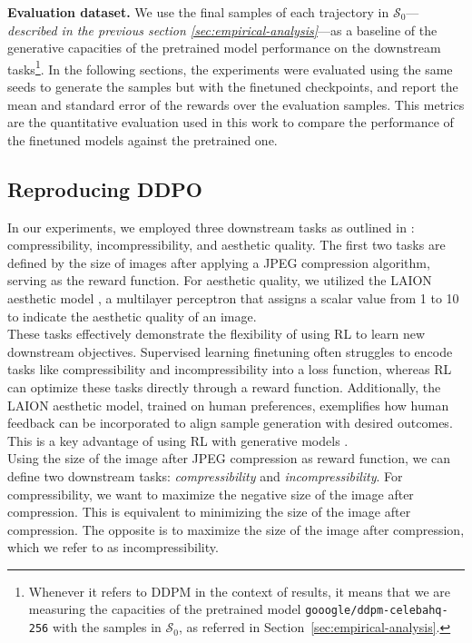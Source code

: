 \noindent \textbf{Evaluation dataset.} We use the final samples of each trajectory in $\mathcal{S}_{0}$---\textit{described in the previous section \ref{sec:empirical-analysis}}---as a baseline of the generative capacities of the pretrained model performance on the downstream tasks\footnote{Whenever it refers to DDPM in the context of results, it means that we are measuring the capacities of the pretrained model \texttt{gooogle/ddpm-celebahq-256} with the samples in $\mathcal{S}_{0}$, as referred in Section~\ref{sec:empirical-analysis}.}. In the following sections, the experiments were evaluated using the same seeds to generate the samples but with the finetuned checkpoints, and report the mean and standard error of the rewards over the evaluation samples. This metrics are the quantitative evaluation used in this work to compare the performance of the finetuned models against the pretrained one. \\

\subsection{Reproducing DDPO}

\noindent In our experiments, we employed three downstream tasks as outlined in \cite{black2023training}: compressibility, incompressibility, and aesthetic quality. The first two tasks are defined by the size of images after applying a JPEG compression algorithm, serving as the reward function. For aesthetic quality, we utilized the LAION aesthetic model \citep{laion2022}, a multilayer perceptron that assigns a scalar value from 1 to 10 to indicate the aesthetic quality of an image. \\

\noindent These tasks effectively demonstrate the flexibility of using RL to learn new downstream objectives. Supervised learning finetuning often struggles to encode tasks like compressibility and incompressibility into a loss function, whereas RL can optimize these tasks directly through a reward function. Additionally, the LAION aesthetic model, trained on human preferences, exemplifies how human feedback can be incorporated to align sample generation with desired outcomes. This is a key advantage of using RL with generative models \citep{ouyang2022training}. \\

\noindent Using the size of the image after JPEG compression as reward function, we can define two downstream tasks: \textit{compressibility} and \textit{incompressibility}. For compressibility, we want to maximize the negative size of the image after compression. This is equivalent to minimizing the size of the image after compression. The opposite is to maximize the size of the image after compression, which we refer to as incompressibility. \\

